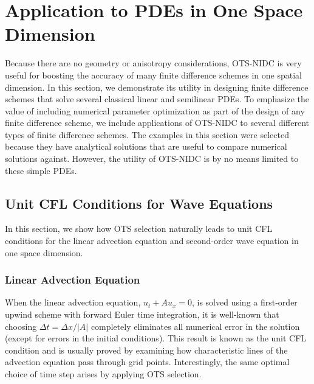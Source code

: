 \documentclass[fleqn,12pt,twoside]{article}
\def\dt{\Delta t}
\def\dx{\Delta x}
\begin{document}
\section{\label{sec:applications_1d} 
         Application to PDEs in One Space Dimension}
Because there are no geometry or anisotropy considerations, OTS-NIDC is very 
useful for boosting the accuracy of many finite difference schemes in one 
spatial dimension.  In this section, we demonstrate its utility in designing 
finite difference schemes that solve several classical linear and semilinear 
PDEs.  To emphasize the value of including numerical parameter 
optimization as part of the design of any finite difference scheme, we 
include applications of OTS-NIDC to several different types of finite 
difference schemes.  The examples in this section were selected because they 
have analytical solutions that are useful to compare numerical solutions 
against.  However, the utility of OTS-NIDC is by no means limited to these
simple PDEs.


\subsection{Unit CFL Conditions for Wave Equations}
In this section, we show how OTS selection naturally leads to unit CFL 
conditions for the linear advection equation and second-order wave equation 
in one space dimension.  

\subsubsection{Linear Advection Equation}
When the linear advection equation, $u_t + A u_x = 0$,
is solved using a first-order upwind scheme with forward Euler time
integration, it is well-known that choosing $\dt = \dx / |A|$ 
completely eliminates all numerical error in the solution (except for 
errors in the initial conditions).  This result is known as the unit CFL 
condition \cite{leveque_book_2002} and is usually proved by examining how 
characteristic lines of the advection equation pass through grid points.  
Interestingly, the same optimal choice of time step arises by applying OTS 
selection.  
\end{document}
